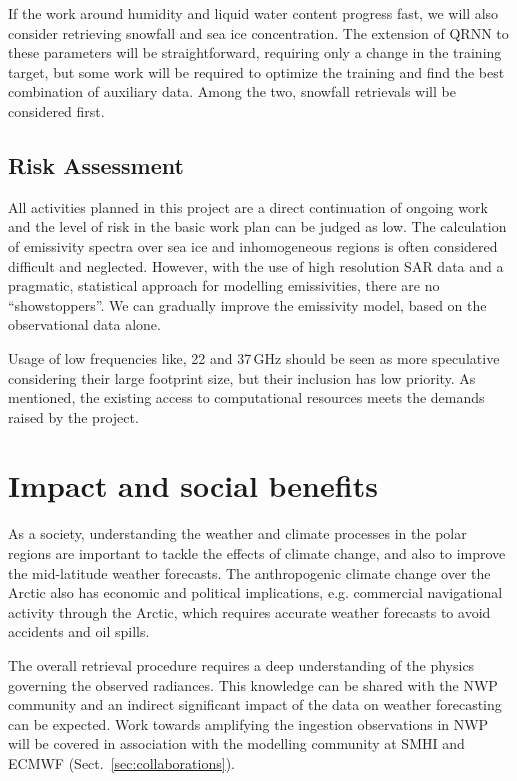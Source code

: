 \documentclass[12pt,oneside,a4paper]{article}
\begin{document}
If the work around humidity and liquid water content progress fast, we will
also consider retrieving snowfall and sea ice concentration. The extension of
QRNN to these parameters will be straightforward, requiring only a change in the
training target, but some work will be required to optimize the training and
find the best combination of auxiliary data. Among the two, snowfall retrievals
will be considered first.
%
 
\subsection{Risk Assessment}
%
\label{sec:risk}
All activities planned in this project are a direct continuation of ongoing
work and the level of risk in the basic work plan can be judged as low. The
calculation of emissivity spectra over sea ice and inhomogeneous regions is
often considered difficult and neglected. However, with the use of high resolution SAR
data and a pragmatic, statistical approach for modelling emissivities,
there are no ``showstoppers''. We can gradually improve the emissivity model,
based on the observational data alone. 

Usage of low frequencies like, 22 and 37\,GHz should be seen as more
speculative considering their large footprint size, but their inclusion has low
priority. As mentioned, the existing access to computational resources meets
the demands raised by the project.


\section{Impact and social benefits}
%
\label{sec:impact}

As a society, understanding the weather and climate processes in the polar
regions are important to tackle the effects of climate change, and also to
improve the mid-latitude weather forecasts. The anthropogenic climate change over
the Arctic also has economic and political implications, e.g. commercial
navigational activity through the Arctic, which requires accurate weather
forecasts to avoid accidents and oil spills.

The overall retrieval procedure requires a deep understanding of the physics
governing the observed radiances. This knowledge can be shared with the NWP community and an indirect significant impact of the data on weather forecasting can be expected. Work towards amplifying the ingestion observations in NWP will be covered in association with the modelling community at SMHI and ECMWF (Sect.~\ref{sec:collaborations}).
\end{document}
